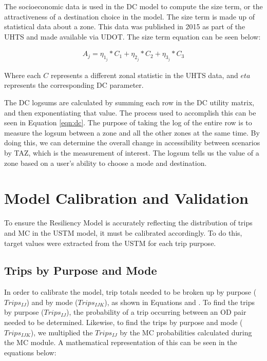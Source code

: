 The socioeconomic data is used in the DC model to compute the size term, or
the attractiveness of
a destination choice in the model. The size term is made up of statistical
data about a zone.
This data was published in 2015 as part of the UHTS and made available via
UDOT.  The size term
equation can be seen below:

\begin{equation}
\begin{aligned}
	A_j = \eta_{1_{j}} * C_1 + \eta_{2_{j}} * C_2 + \eta_{3_{j}} * C_{3}
	\label{eqn:sizeterm}
\end{aligned}
\end{equation}

\noindent Where each $C$ represents a different zonal statistic in the UHTS data,
and $eta$ represents the corresponding DC parameter.

The DC logsums are calculated by summing each row in the DC utility matrix,
and then
exponentiating that value. The process used to accomplish this can be seen
in Equation \ref{eqn:dc}.
The purpose of taking the log of the entire row is to measure the logsum
between a zone and all
the other zones at the same time. By doing this, we can determine the overall
change in accessibility
between scenarios by TAZ, which is the measurement of interest. The logsum
tells us the value of
a zone based on a user’s ability to choose a mode and destination.

\section{Model Calibration and Validation}

To ensure the Resiliency Model is accurately reflecting the distribution
of trips and MC in the USTM model, it must be
calibrated accordingly. To do this, target values were extracted from the
USTM for each trip purpose.

\subsection{Trips by Purpose and Mode}

In order to calibrate the model, trip totals needed to be broken up by purpose
(\(Trips_{IJ}\)) and by mode (\(Trips_{IJK}\)), as shown in Equations
\label{eqn:ij} and \label{eqn:ijk}. To find the trips by purpose
(\(Trips_{IJ}\)), the probability of a trip occurring between an OD pair needed to
be determined. Likewise, to find the trips by purpose and mode (\(Trips_{IJK}\)),
we multiplied the \(Trips_{IJ}\) by the MC probabilities calculated during the MC
module. A mathematical representation of this can be seen in the equations
below:

